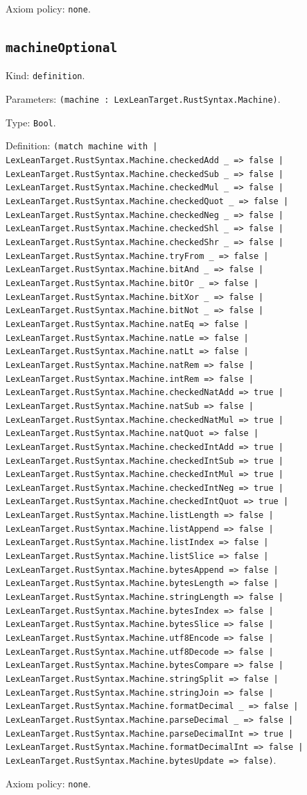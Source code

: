 \documentclass[11pt]{article}
\begin{document}
\noindent Axiom policy: \texttt{none}.\par
\subsection*{\texttt{machineOptional}}
\noindent Kind: \texttt{definition}.\par
\noindent Parameters: \texttt{(machine : LexLeanTarget.RustSyntax.Machine)}.\par
\noindent Type: \texttt{Bool}.\par
\noindent Definition: \texttt{(match machine with | LexLeanTarget.RustSyntax.Machine.checkedAdd \_ => false | LexLeanTarget.RustSyntax.Machine.checkedSub \_ => false | LexLeanTarget.RustSyntax.Machine.checkedMul \_ => false | LexLeanTarget.RustSyntax.Machine.checkedQuot \_ => false | LexLeanTarget.RustSyntax.Machine.checkedNeg \_ => false | LexLeanTarget.RustSyntax.Machine.checkedShl \_ => false | LexLeanTarget.RustSyntax.Machine.checkedShr \_ => false | LexLeanTarget.RustSyntax.Machine.tryFrom \_ => false | LexLeanTarget.RustSyntax.Machine.bitAnd \_ => false | LexLeanTarget.RustSyntax.Machine.bitOr \_ => false | LexLeanTarget.RustSyntax.Machine.bitXor \_ => false | LexLeanTarget.RustSyntax.Machine.bitNot \_ => false | LexLeanTarget.RustSyntax.Machine.natEq => false | LexLeanTarget.RustSyntax.Machine.natLe => false | LexLeanTarget.RustSyntax.Machine.natLt => false | LexLeanTarget.RustSyntax.Machine.natRem => false | LexLeanTarget.RustSyntax.Machine.intRem => false | LexLeanTarget.RustSyntax.Machine.checkedNatAdd => true | LexLeanTarget.RustSyntax.Machine.natSub => false | LexLeanTarget.RustSyntax.Machine.checkedNatMul => true | LexLeanTarget.RustSyntax.Machine.natQuot => false | LexLeanTarget.RustSyntax.Machine.checkedIntAdd => true | LexLeanTarget.RustSyntax.Machine.checkedIntSub => true | LexLeanTarget.RustSyntax.Machine.checkedIntMul => true | LexLeanTarget.RustSyntax.Machine.checkedIntNeg => true | LexLeanTarget.RustSyntax.Machine.checkedIntQuot => true | LexLeanTarget.RustSyntax.Machine.listLength => false | LexLeanTarget.RustSyntax.Machine.listAppend => false | LexLeanTarget.RustSyntax.Machine.listIndex => false | LexLeanTarget.RustSyntax.Machine.listSlice => false | LexLeanTarget.RustSyntax.Machine.bytesAppend => false | LexLeanTarget.RustSyntax.Machine.bytesLength => false | LexLeanTarget.RustSyntax.Machine.stringLength => false | LexLeanTarget.RustSyntax.Machine.bytesIndex => false | LexLeanTarget.RustSyntax.Machine.bytesSlice => false | LexLeanTarget.RustSyntax.Machine.utf8Encode => false | LexLeanTarget.RustSyntax.Machine.utf8Decode => false | LexLeanTarget.RustSyntax.Machine.bytesCompare => false | LexLeanTarget.RustSyntax.Machine.stringSplit => false | LexLeanTarget.RustSyntax.Machine.stringJoin => false | LexLeanTarget.RustSyntax.Machine.formatDecimal \_ => false | LexLeanTarget.RustSyntax.Machine.parseDecimal \_ => false | LexLeanTarget.RustSyntax.Machine.parseDecimalInt => true | LexLeanTarget.RustSyntax.Machine.formatDecimalInt => false | LexLeanTarget.RustSyntax.Machine.bytesUpdate => false)}.\par
\noindent Axiom policy: \texttt{none}.\par
\end{document}

